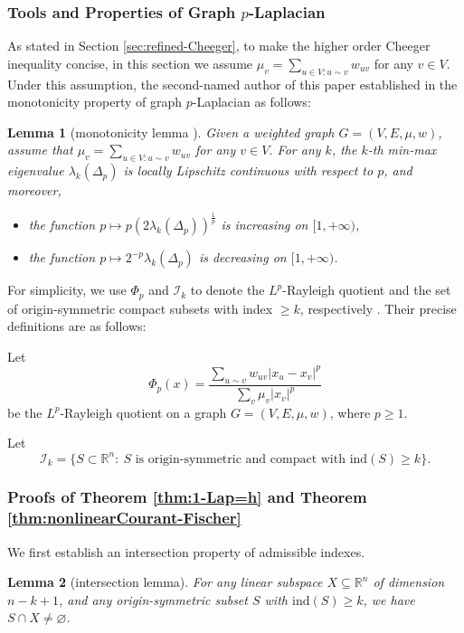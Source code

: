 \documentclass[12pt, reqno]{article}
\newtheorem{lemma}{Lemma}
\newcommand{\R}{\mathbb{R}}
\newcommand{\II}{\mathcal{I}}
\begin{document}
\subsubsection{Tools and Properties of Graph $p$-Laplacian
} \label{sec:tools}
As stated in Section \ref{sec:refined-Cheeger}, to make the higher order Cheeger inequality concise, in this section we assume $\mu_v=\sum_{u\in V:u\sim v}w_{uv}$ for any $v\in V$.
Under this assumption, the second-named author of this paper established in \cite{Zhang} the monotonicity property of graph $p$-Laplacian as follows: 
\begin{lemma}[monotonicity lemma \cite{Zhang}]\label{lem:p-monotonicity}
Given a weighted graph $G=(V,E,\mu,w)$, assume that $\mu_v=\sum_{u\in V:u\sim v}w_{uv}$ for any $v\in V$. 
For any $k$, the $k$-th min-max eigenvalue $\lambda_k(\Delta_p)$ is locally Lipschitz continuous with respect to $p$, and moreover, 
\begin{itemize}
    \item the function $p\mapsto p(2\lambda_k(\Delta_p))^{\frac1p}$ 
is increasing  on $%
[1,+\infty)$,
\item %
the function 
$p\mapsto2^{-p}\lambda_k(\Delta_p)$ is decreasing on $[1,+\infty)$.
\end{itemize}    
\end{lemma}

For simplicity, we use $\Phi_p$ and $\II_k$ to denote the $L^p$-Rayleigh quotient and the set of origin-symmetric compact subsets with index $\ge k$, respectively \cite{Burger,Deidda25,HN25}. Their precise definitions are as follows:

Let $$\Phi_p(x)=\frac{\sum\limits_{u\sim v}w_{uv}|x_u-x_v|^p}{\sum\limits_v\mu_v|x_v|^p} $$
be the $L^p$-Rayleigh quotient on a graph $G=(V,E,\mu,w)$, where $p\ge1$. 

Let $$\II_k=\{S\subset \R^n:~S\text{ is origin-symmetric and compact with }\mathrm{ind}(S)\ge k\}.$$

\subsubsection{Proofs of Theorem \ref{thm:1-Lap=h} and Theorem \ref{thm:nonlinearCourant-Fischer}}
We first establish an intersection property of admissible indexes. 
\begin{lemma}[intersection lemma]\label{lem:intersect}
For any linear subspace $X\subseteq\mathbb{R}^n$ of dimension $n-k+1$, and any origin-symmetric subset $S$ with $\mathrm{ind}(S)\ge k$, we have $S\cap X\ne\varnothing$. 
\end{lemma}
\end{document}
